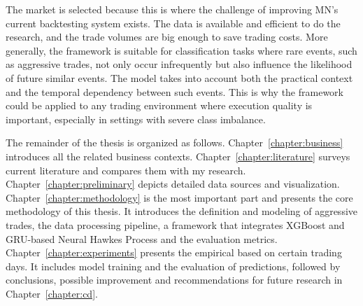 The market is selected because this is where the challenge of improving MN's current backtesting system exists. The data is available and efficient to do the research, and the trade volumes are big enough to save trading costs. More generally, the framework is suitable for classification tasks where rare events, such as aggressive trades, not only occur infrequently but also influence the likelihood of future similar events. The model takes into account both the practical context and the temporal dependency between such events. This is why the framework could be applied to any trading environment where execution quality is important, especially in settings with severe class imbalance. 

The remainder of the thesis is organized as follows. Chapter~\ref{chapter:business} introduces all the related business contexts. Chapter~\ref{chapter:literature} surveys current literature and compares them with my research. Chapter~\ref{chapter:preliminary} depicts detailed data sources and visualization. Chapter~\ref{chapter:methodology} is the most important part and presents the core methodology of this thesis. It introduces the definition and modeling of aggressive trades, the data processing pipeline, a framework that integrates XGBoost and GRU-based Neural Hawkes Process and the evaluation metrics. Chapter~\ref{chapter:experiments} presents the empirical based on certain trading days. It includes model training and the evaluation of predictions, followed by conclusions, possible improvement and recommendations for future research in Chapter~\ref{chapter:cd}.